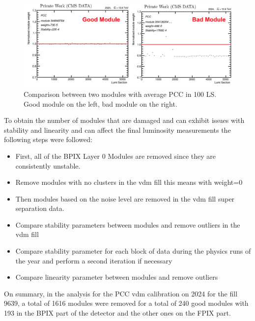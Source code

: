 \begin{figure}[H]
    \centering
    \includegraphics[height=0.35\textwidth ,width=1\textwidth]{module.png}
    \caption[Comparison good module and bad module.]{Comparison between two modules with average PCC in 100 LS. Good module on the left, bad module on the right.}
    \label{fig:modules}
\end{figure}


To obtain the number of modules that are damaged and can exhibit issues with stability and linearity and can affect the final luminosity measurements the following steps were followed: 

\begin{itemize}
  \item First, all of the BPIX Layer 0 Modules are removed since they are consistently unstable.
  \item Remove modules with no clusters in the vdm fill this means with weight=0 
  \item Then modules based on the noise level are removed in the vdm fill super separation data. 
  \item Compare stability parameters between modules and remove outliers in the vdm fill
  \item Compare stability parameter for each block of data during the physics runs of the year and perform a second iteration if necessary
  \item Compare linearity parameter between modules and remove outliers
\end{itemize}

On summary, in the analysis for the PCC vdm calibration on 2024 for the fill 9639, a total of 1616 modules were removed for a total of 240 good modules with 193 in the BPIX part of the detector and the other ones on the FPIX part. 
